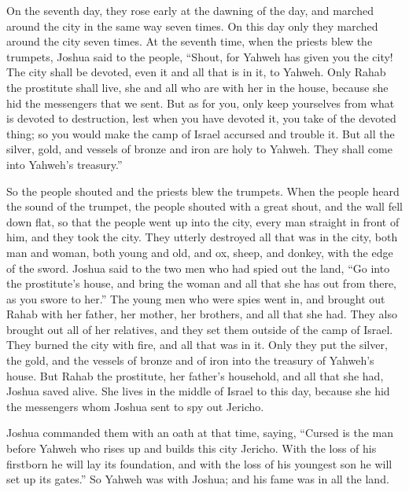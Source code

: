  On the seventh day, they rose early at the dawning of the
day, and marched around the city in the same way seven times. On this
day only they marched around the city seven times.  At the
seventh time, when the priests blew the trumpets, Joshua said to the
people, ``Shout, for Yahweh has given you the city!  The
city shall be devoted, even it and all that is in it, to Yahweh. Only
Rahab the prostitute shall live, she and all who are with her in the
house, because she hid the messengers that we sent.  But as
for you, only keep yourselves from what is devoted to destruction, lest
when you have devoted it, you take of the devoted thing; so you would
make the camp of Israel accursed and trouble it.  But all
the silver, gold, and vessels of bronze and iron are holy to Yahweh.
They shall come into Yahweh's treasury.''

 So the people shouted and the priests blew the trumpets.
When the people heard the sound of the trumpet, the people shouted with
a great shout, and the wall fell down flat, so that the people went up
into the city, every man straight in front of him, and they took the
city.  They utterly destroyed all that was in the city,
both man and woman, both young and old, and ox, sheep, and donkey, with
the edge of the sword.  Joshua said to the two men who had
spied out the land, ``Go into the prostitute's house, and bring the
woman and all that she has out from there, as you swore to her.''
 The young men who were spies went in, and brought out
Rahab with her father, her mother, her brothers, and all that she had.
They also brought out all of her relatives, and they set them outside of
the camp of Israel.  They burned the city with fire, and
all that was in it. Only they put the silver, the gold, and the vessels
of bronze and of iron into the treasury of Yahweh's house. 
But Rahab the prostitute, her father's household, and all that she had,
Joshua saved alive. She lives in the middle of Israel to this day,
because she hid the messengers whom Joshua sent to spy out Jericho.

 Joshua commanded them with an oath at that time, saying,
``Cursed is the man before Yahweh who rises up and builds this city
Jericho. With the loss of his firstborn he will lay its foundation, and
with the loss of his youngest son he will set up its gates.''
 So Yahweh was with Joshua; and his fame was in all the
land.

